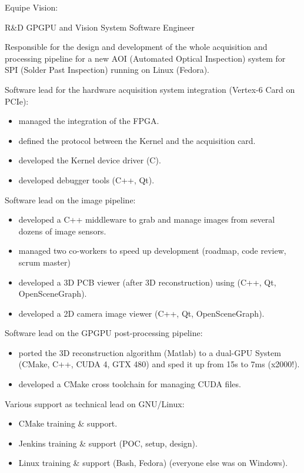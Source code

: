 \documentclass{article}
\begin{document}
\begin{llist}
{Equipe Vision:

}

 {
R\&D GPGPU and Vision System Software Engineer\\
\vspace{-0.33cm}

Responsible for the design and development of the whole acquisition and processing pipeline
for a new AOI (Automated Optical Inspection) system for SPI (Solder Past Inspection)
 running on Linux (Fedora).
\item Software lead for the hardware acquisition system integration (Vertex-6 Card on PCIe):
\begin{itemize}
\item managed the integration of the FPGA.
\item defined the protocol between the Kernel and the acquisition card.
\item developed the Kernel device driver (C).
\item developed debugger tools (C++, Qt).
\end{itemize}
\item Software lead on the image pipeline:
\begin{itemize}
\item developed a C++ middleware to grab and manage images from several dozens of image sensors.
\item managed two co-workers to speed up development (roadmap, code review, scrum master)
\item developed a 3D PCB viewer (after 3D reconstruction) using (C++, Qt, OpenSceneGraph).
\item developed a 2D camera image viewer (C++, Qt, OpenSceneGraph).
\end{itemize}
\item Software lead on the GPGPU post-processing pipeline:
\begin{itemize}
\item ported the 3D reconstruction algorithm (Matlab) to a dual-GPU System (CMake, C++, CUDA 4, GTX 480)
 and sped it up from 15s to 7ms (x2000!).
\item developed a CMake cross toolchain for managing CUDA files.
\end{itemize}

Various support as technical lead on GNU/Linux:
\begin{itemize}
\item CMake training \& support.
\item Jenkins training \& support (POC, setup, design).
\item Linux training \& support (Bash, Fedora) (everyone else was on Windows).
\end{itemize}
} {}


\end{llist}
\end{document}
